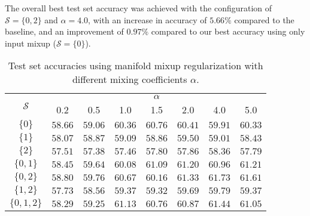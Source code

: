 The overall best test set accuracy was achieved with the configuration of $\mathcal{S}=\{0,2\}$ and $\alpha=4.0$, with an increase in accuracy of $5.66\%$ compared to the baseline, and an improvement of $0.97\%$ compared to our best accuracy using only input mixup ($\mathcal{S}=\{0\}$).



\begin{table}[H]
    \centering
    \begin{tabular}{c|ccccccc}
        \toprule
        \multirow{2}{*}{$\mathcal{S}$} & \multicolumn{7}{|c}{$\alpha$} \\
        & 0.2 & 0.5 & 1.0 & 1.5 & 2.0 & 4.0 & 5.0\\ 
        \midrule
        $\{ 0 \}$       & $58.66$ & $59.06$ & $60.36$ & $60.76$ & $60.41$ & $59.91$ & $60.33$ \\
        $\{ 1 \}$       & $58.07$ & $58.87$ & $59.09$ & $58.86$ & $59.50$ & $59.01$ & $58.43$\\
        $\{ 2 \}$       & $57.51$ & $57.38$ & $57.46$ & $57.80$ & $57.86$ & $58.36$ & $57.79$\\
        $\{ 0, 1 \}$    & $58.45$ & $59.64$ & $60.08$ & $\bm{61.09}$ & $61.20$ & $60.96$ & $61.21$ \\
        $\{ 0, 2 \}$    & $\bm{58.80}$ & $\bm{59.76}$ & $60.67$ & $60.16$ & $\bm{61.33}$ & $\bm{61.73}$ & $\bm{61.61}$\\
        $\{ 1, 2 \}$    & $57.73$ & $58.56$ & $59.37$ & $59.32$ & $59.69$ & $59.79$ & $59.37$\\
        $\{ 0, 1, 2 \}$ & $58.29$ & $59.25$ & $\bm{61.13}$ & $60.76$ & $60.87$ & $61.44$ & $61.05$\\
        
        \bottomrule
    \end{tabular}
    \caption{Test set accuracies using manifold mixup regularization with different mixing coefficients $\alpha$.}
    \label{tab:experiments}
\end{table}




